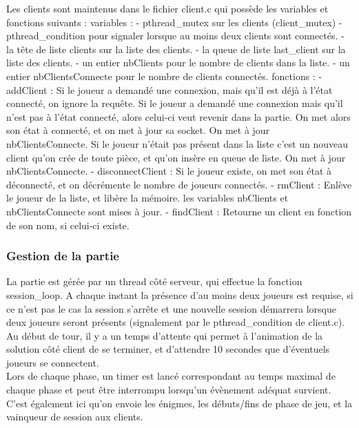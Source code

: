 \documentclass[11pt]{article}
\begin{document}
Les clients sont maintenus dans le fichier client.c qui possède les variables et fonctions suivants :
variables :
- pthread\_mutex sur les clients (client\_mutex)
- pthread\_condition pour signaler lorsque au moins deux clients sont connectés.
- la tête de liste clients sur la liste des clients.
- la queue de liste last\_client sur la liste des clients.
- un entier nbClients pour le nombre de clients dans la liste.
- un entier nbClientsConnecte pour le nombre de clients connectés.
fonctions :
- addClient :
Si le joueur a demandé une connexion, mais qu'il est déjà à l'état connecté, on ignore la requête.
Si le joueur a demandé une connexion mais qu'il n'est pas à l'état connecté, alors celui-ci veut revenir dans la partie. On met alors son état à connecté, et on met à jour sa socket. On met à jour nbClientsConnecte.
Si le joueur n'était pas présent dans la liste c'est un nouveau client qu'on crée de toute pièce, et qu'on insère en queue de liste. On met à jour nbClientsConnecte.
- disconnectClient :
Si le joueur existe, on met son état à déconnecté, et on décrémente le nombre de joueurs connectés.
- rmClient : Enlève le joueur de la liste, et libère la mémoire. les variables nbClients et nbClientsConnecte sont mises à jour.
- findClient :
Retourne un client en fonction de son nom, si celui-ci existe.

\subsubsection{Gestion de la partie}
La partie est gérée par un thread côté serveur, qui effectue la fonction session\_loop. A chaque instant la présence d'au moins deux joueurs est requise, si ce n'est pas le cas la session s'arrête et une nouvelle session démarrera lorsque deux joueurs seront présents (signalement par le pthread\_condition de client.c).\\
Au début de tour, il y a un temps d'attente qui permet à l'animation de la solution côté client de se terminer, et d'attendre 10 secondes que d'éventuels joueurs se connectent.\\
Lors de chaque phase, un timer est lancé correspondant au temps maximal de chaque phase et peut être interrompu lorsqu'un évènement adéquat survient. C'est également ici qu'on envoie les énigmes, les débuts/fins de phase de jeu, et la vainqueur de session aux clients.
\end{document}
